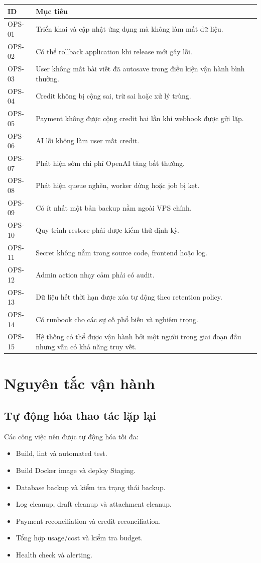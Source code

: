 \documentclass[11pt,a4paper]{article}
\begin{document}
\begin{longtable}{L{0.08\textwidth}L{0.84\textwidth}}
\toprule
\textbf{ID} & \textbf{Mục tiêu} \\
\midrule
OPS-01 & Triển khai và cập nhật ứng dụng mà không làm mất dữ liệu. \\
OPS-02 & Có thể rollback application khi release mới gây lỗi. \\
OPS-03 & User không mất bài viết đã autosave trong điều kiện vận hành bình thường. \\
OPS-04 & Credit không bị cộng sai, trừ sai hoặc xử lý trùng. \\
OPS-05 & Payment không được cộng credit hai lần khi webhook được gửi lặp. \\
OPS-06 & AI lỗi không làm user mất credit. \\
OPS-07 & Phát hiện sớm chi phí OpenAI tăng bất thường. \\
OPS-08 & Phát hiện queue nghẽn, worker dừng hoặc job bị kẹt. \\
OPS-09 & Có ít nhất một bản backup nằm ngoài VPS chính. \\
OPS-10 & Quy trình restore phải được kiểm thử định kỳ. \\
OPS-11 & Secret không nằm trong source code, frontend hoặc log. \\
OPS-12 & Admin action nhạy cảm phải có audit. \\
OPS-13 & Dữ liệu hết thời hạn được xóa tự động theo retention policy. \\
OPS-14 & Có runbook cho các sự cố phổ biến và nghiêm trọng. \\
OPS-15 & Hệ thống có thể được vận hành bởi một người trong giai đoạn đầu nhưng vẫn có khả năng truy vết. \\
\bottomrule
\end{longtable}

\section{Nguyên tắc vận hành}

\subsection{Tự động hóa thao tác lặp lại}

Các công việc nên được tự động hóa tối đa:

\begin{itemize}
  \item Build, lint và automated test.
  \item Build Docker image và deploy Staging.
  \item Database backup và kiểm tra trạng thái backup.
  \item Log cleanup, draft cleanup và attachment cleanup.
  \item Payment reconciliation và credit reconciliation.
  \item Tổng hợp usage/cost và kiểm tra budget.
  \item Health check và alerting.
\end{itemize}
\end{document}
